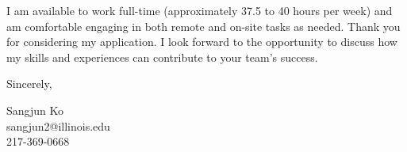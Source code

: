 \documentclass[11pt]{article}
\begin{document}
I am available to work full-time (approximately 37.5 to 40 hours per week) and am comfortable engaging in both remote and on-site tasks as needed. Thank you for considering my application. I look forward to the opportunity to discuss how my skills and experiences can contribute to your team’s success.


\vspace{1em}

Sincerely,

\vspace{2em}

\noindent
Sangjun Ko\\
sangjun2@illinois.edu\\
217-369-0668
\end{document}
